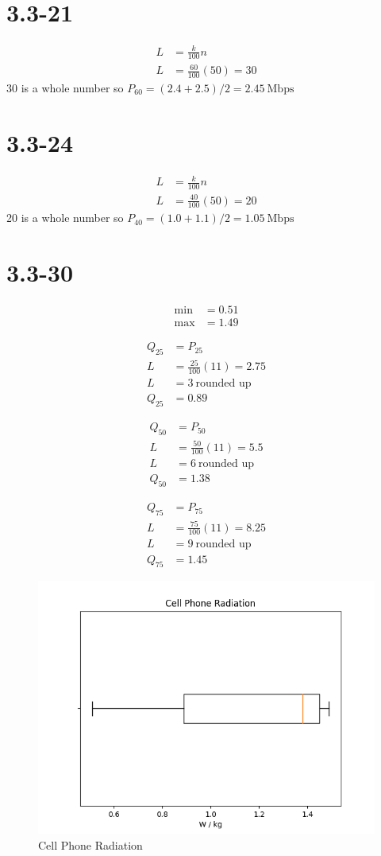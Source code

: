 \documentclass[12pt,fleqn]{article}
\newcommand{\chapter}{3.3}
\newcommand{\problem}[1]{\vspace{5ex}\section*{\chapter-#1}}
\begin{document}
\problem{21}
\begin{align*}
  L &= \frac{k}{100}n \\
  L &= \frac{60}{100}(50) = 30
\end{align*}
30 is a whole number so $P_{60} = (2.4 + 2.5) / 2 = 2.45~\text{Mbps}$


\problem{24}
\begin{align*}
  L &= \frac{k}{100}n \\
  L &= \frac{40}{100}(50) = 20
\end{align*}
20 is a whole number so $P_{40} = (1.0 + 1.1) / 2 = 1.05~\text{Mbps}$


\problem{30}
\begin{align*}
  \text{min} &= 0.51 \\
  \text{max} &= 1.49
\end{align*}

\begin{align*}
  Q_{25} &= P_{25} \\
  L &= \frac{25}{100}(11) = 2.75 \\
  L &= 3~ \text{rounded up} \\
  Q_{25} &= 0.89
\end{align*}

\begin{align*}
  Q_{50} &= P_{50} \\
  L &= \frac{50}{100}(11) = 5.5 \\
  L &= 6~ \text{rounded up} \\
  Q_{50} &= 1.38
\end{align*}

\begin{align*}
  Q_{75} &= P_{75} \\
  L &= \frac{75}{100}(11) = 8.25 \\
  L &= 9~ \text{rounded up} \\
  Q_{75} &= 1.45
\end{align*}

\begin{figure}[ht]
  \centering
  \includegraphics[width=12cm]{assets/cell-phone-radiation.png}
  \caption{Cell Phone Radiation}
\end{figure}
\end{document}
